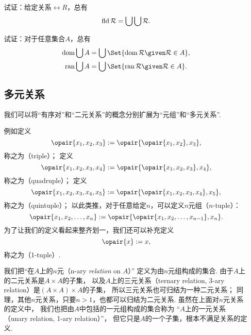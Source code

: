 \begin{example}
试证：给定关系\(\rel{R}\)，总有\begin{equation*}
	\operatorname{fld} \mathcal{R} = \bigcup\bigcup \mathcal{R}.
\end{equation*}
\end{example}

\begin{example}
试证：对于任意集合\(A\)，总有\begin{gather}
	\dom\bigcup A = \bigcup\Set{ \dom\rel{R} \given \rel{R} \in A }, \\
	\ran\bigcup A = \bigcup\Set{ \ran\rel{R} \given \rel{R} \in A }.
\end{gather}
\end{example}

\subsection{多元关系}
我们可以将“有序对”和“二元关系”的概念分别扩展为“元组”和“多元关系”.

例如定义\begin{equation*}
	\opair{x_1,x_2,x_3}
	\defeq
	\opair{\opair{x_1,x_2},x_3},
\end{equation*}
称之为（triple）；
定义\begin{equation*}
	\opair{x_1,x_2,x_3,x_4}
	\defeq
	\opair{\opair{x_1,x_2,x_3},x_4},
\end{equation*}
称之为（quadruple）；
定义\begin{equation*}
	\opair{x_1,x_2,x_3,x_4,x_5}
	\defeq
	\opair{\opair{x_1,x_2,x_3,x_4},x_5},
\end{equation*}
称之为（quintuple）；
以此类推，对于任意给定\(n\)，可以定义\(n\)元组（\(n\)-tuple）：\begin{equation*}
	\opair{x_1,x_2,\dotsc,x_n}
	\defeq
	\opair{\opair{x_1,x_2,\dotsc,x_{n-1}},x_n}.
\end{equation*}
为了让我们的定义看起来整齐划一，我们还可以补充定义\begin{equation*}
	\opair{x} \defeq x,
\end{equation*}
称之为（1-tuple）.

我们把“在\(A\)上的\(n\)元（n-ary \emph{relation} on \(A\)）”
定义为由\(n\)元组构成的集合.
由于\(A\)上的二元关系是\(A \times A\)的子集，
以及\(A\)上的三元关系（ternary relation, 3-ary relation）是\((A \times A) \times A\)的子集，
所以三元关系也可归结为一种二元关系；
同理，其他\(n\)元关系，只要\(n>1\)，也都可以归结为二元关系.
虽然在上面对\(n\)元关系的定义中，
我们也把由\(A\)中包括的一元组构成的集合称为
“\(A\)上的一元关系（unary relation, 1-ary relation）”，
但它只是\(A\)的一个子集，根本不满足关系的定义.

